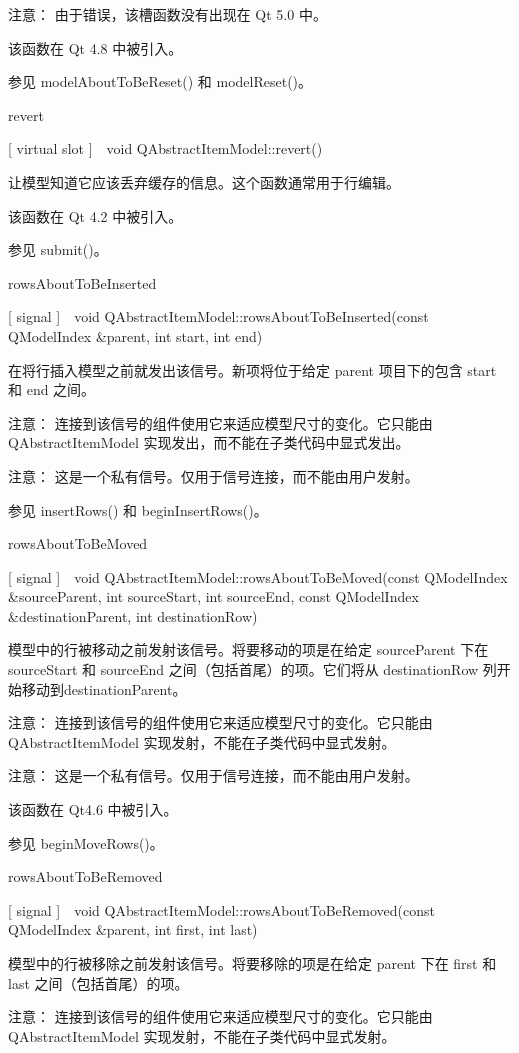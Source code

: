 注意： 由于错误，该槽函数没有出现在 Qt 5.0 中。

该函数在 Qt 4.8 中被引入。

参见 modelAboutToBeReset() 和 modelReset()。

revert

[ virtual slot ] void QAbstractItemModel::revert()

让模型知道它应该丢弃缓存的信息。这个函数通常用于行编辑。

该函数在 Qt 4.2 中被引入。

参见 submit()。

rowsAboutToBeInserted

[ signal ] void QAbstractItemModel::rowsAboutToBeInserted(const QModelIndex \&parent, int start, int end)

在将行插入模型之前就发出该信号。新项将位于给定 parent 项目下的包含 start 和 end 之间。

注意： 连接到该信号的组件使用它来适应模型尺寸的变化。它只能由 QAbstractItemModel 实现发出，而不能在子类代码中显式发出。

注意： 这是一个私有信号。仅用于信号连接，而不能由用户发射。

参见 insertRows() 和 beginInsertRows()。

rowsAboutToBeMoved

[ signal ] void QAbstractItemModel::rowsAboutToBeMoved(const QModelIndex \&sourceParent, int sourceStart, int sourceEnd, const QModelIndex \&destinationParent, int destinationRow)

模型中的行被移动之前发射该信号。将要移动的项是在给定 sourceParent 下在 sourceStart 和 sourceEnd 之间（包括首尾）的项。它们将从 destinationRow 列开始移动到destinationParent。

注意： 连接到该信号的组件使用它来适应模型尺寸的变化。它只能由 QAbstractItemModel 实现发射，不能在子类代码中显式发射。

注意： 这是一个私有信号。仅用于信号连接，而不能由用户发射。

该函数在 Qt4.6 中被引入。

参见 beginMoveRows()。

rowsAboutToBeRemoved

[ signal ] void QAbstractItemModel::rowsAboutToBeRemoved(const QModelIndex \&parent, int first, int last)

模型中的行被移除之前发射该信号。将要移除的项是在给定 parent 下在 first 和 last 之间（包括首尾）的项。

注意： 连接到该信号的组件使用它来适应模型尺寸的变化。它只能由 QAbstractItemModel 实现发射，不能在子类代码中显式发射。

